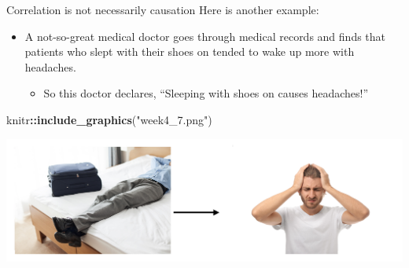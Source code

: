 \documentclass[
  ignorenonframetext,
]{beamer}
\newenvironment{Shaded}{\begin{snugshade}}{\end{snugshade}}
\newcommand{\FunctionTok}[1]{\textcolor[rgb]{0.13,0.29,0.53}{\textbf{#1}}}
\newcommand{\NormalTok}[1]{#1}
\newcommand{\SpecialCharTok}[1]{\textcolor[rgb]{0.81,0.36,0.00}{\textbf{#1}}}
\newcommand{\StringTok}[1]{\textcolor[rgb]{0.31,0.60,0.02}{#1}}
\providecommand{\tightlist}{%
  \setlength{\itemsep}{0pt}\setlength{\parskip}{0pt}}
\begin{document}
\begin{frame}[fragile]{Correlation is not necessarily causation}
\protect\hypertarget{correlation-is-not-necessarily-causation-1}{}
Here is another example:

\begin{itemize}
\item
  A not-so-great medical doctor goes through medical records and finds
  that patients who slept with their shoes on tended to wake up more
  with headaches.

  \begin{itemize}
  \tightlist
  \item
    So this doctor declares, ``Sleeping with shoes on causes
    headaches!''
  \end{itemize}
\end{itemize}

\begin{Shaded}
\begin{Highlighting}[]
\NormalTok{knitr}\SpecialCharTok{::}\FunctionTok{include\_graphics}\NormalTok{(}\StringTok{"week4\_7.png"}\NormalTok{)}
\end{Highlighting}
\end{Shaded}

\begin{center}\includegraphics[width=0.8\linewidth,height=0.35\textheight]{week4_7} \end{center}
\end{frame}
\end{document}
